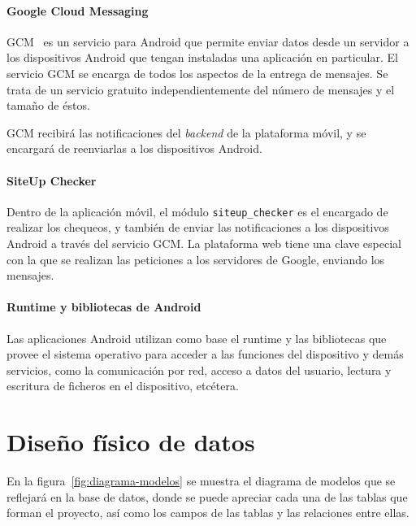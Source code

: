 \paragraph{Google Cloud Messaging}

GCM~\cite{gcm} es un servicio para Android que permite enviar datos desde un
servidor a los dispositivos Android que tengan instaladas una aplicación en
particular. El servicio GCM se encarga de todos los aspectos de la entrega de
mensajes. Se trata de un servicio gratuito independientemente del número de
mensajes y el tamaño de éstos.

GCM recibirá las notificaciones del \textit{backend} de la plataforma móvil, y
se encargará de reenviarlas a los dispositivos Android.

\paragraph{SiteUp Checker}

Dentro de la aplicación móvil, el módulo \texttt{siteup\_checker} es el
encargado de realizar los chequeos, y también de enviar las notificaciones a los
dispositivos Android a través del servicio GCM. La plataforma web tiene una
clave especial con la que se realizan las peticiones a los servidores de Google,
enviando los mensajes.

\paragraph{Runtime y bibliotecas de Android}

Las aplicaciones Android utilizan como base el runtime y las bibliotecas que
provee el sistema operativo para acceder a las funciones del dispositivo y demás
servicios, como la comunicación por red, acceso a datos del usuario, lectura y
escritura de ficheros en el dispositivo, etcétera.


\section{Diseño físico de datos}
\label{sec:diseno-fisico-datos}

En la figura~\ref{fig:diagrama-modelos} se muestra el diagrama de modelos que se
reflejará en la base de datos, donde se puede apreciar cada una de las tablas
que forman el proyecto, así como los campos de las tablas y las relaciones entre
ellas.

